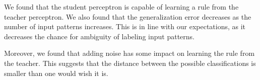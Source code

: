 We found that the student perceptron is capable of learning a rule from the teacher perceptron. 
We also found that the generalization error decreases as the number of input patterns increases. 
This is in line with our expectations, as it decreases the chance for ambiguity of labeling input patterns.

Moreover, we found that adding noise has some impact on learning the rule from the teacher.
This suggests that the distance between the possible classifications is smaller than one would wish it is.